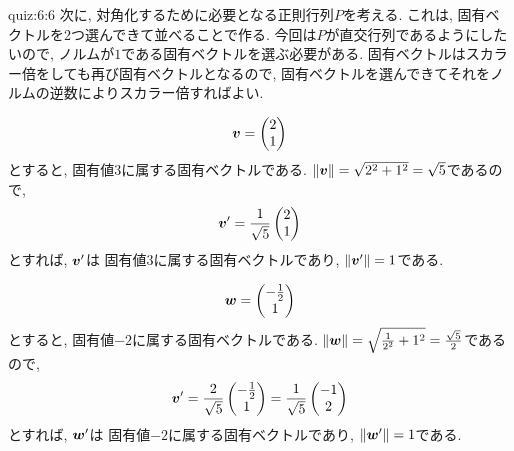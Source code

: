 \begin{answerof}{quiz:6:6}
  次に, 対角化するために必要となる正則行列$P$を考える.
  これは, 固有ベクトルを2つ選んできて並べることで作る.
  今回は$P$が直交行列であるようにしたいので,
  ノルムが$1$である固有ベクトルを選ぶ必要がある.
  固有ベクトルはスカラー倍をしても再び固有ベクトルとなるので,
  固有ベクトルを選んできてそれをノルムの逆数によりスカラー倍すればよい.
  

  \begin{align*}
    \boldsymbol{v}=
    \begin{pmatrix}
      2\\1
    \end{pmatrix}
  \end{align*}
  とすると,
  固有値$3$に属する固有ベクトルである.
  $\|\boldsymbol{v}\|=\sqrt{2^2+1^2}=\sqrt{5}$であるので,
  \begin{align*}
    \boldsymbol{v}'=
    \frac{1}{\sqrt{5}}
    \begin{pmatrix}
      2\\1
    \end{pmatrix}
  \end{align*}
  とすれば, $\boldsymbol{v}'$は
  固有値$3$に属する固有ベクトルであり,
  $\|\boldsymbol{v}'\|=1$である.

  
  \begin{align*}
    \boldsymbol{w}=
    \begin{pmatrix}
      -\frac{1}{2}\\1
    \end{pmatrix}
  \end{align*}
  とすると,
  固有値$-2$に属する固有ベクトルである.
  $\|\boldsymbol{w}\|=\sqrt{\frac{1}{2^2}+1^2}=\frac{\sqrt{5}}{2}$であるので,
  \begin{align*}
    \boldsymbol{v}'=
    \frac{2}{\sqrt{5}}
    \begin{pmatrix}
      -\frac{1}{2}\\1
    \end{pmatrix}
    =
    \frac{1}{\sqrt{5}}
    \begin{pmatrix}
      -1\\2
    \end{pmatrix}
  \end{align*}
  とすれば, $\boldsymbol{w}'$は
  固有値$-2$に属する固有ベクトルであり,
  $\|\boldsymbol{w}'\|=1$である.


\end{answerof}
